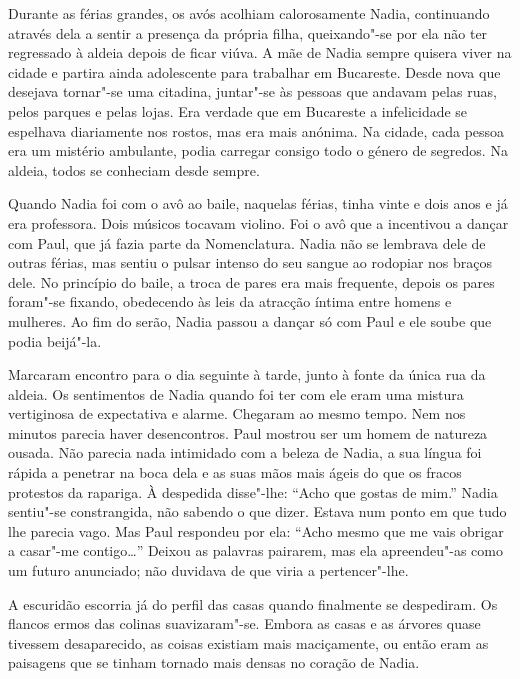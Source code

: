 Durante as férias grandes, os avós acolhiam calorosamente Nadia,
continuando através dela a sentir a presença da própria filha,
queixando"-se por ela não ter regressado à aldeia depois de ficar viúva.
A mãe de Nadia sempre quisera viver na cidade e partira ainda
adolescente para trabalhar em Bucareste. Desde nova que desejava
tornar"-se uma citadina, juntar"-se às pessoas que andavam pelas ruas,
pelos parques e pelas lojas. Era verdade que em Bucareste a infelicidade
se espelhava diariamente nos rostos, mas era mais anónima. Na cidade,
cada pessoa era um mistério ambulante, podia carregar consigo todo o
género de segredos. Na aldeia, todos se conheciam desde sempre.

Quando Nadia foi com o avô ao baile, naquelas férias, tinha vinte e dois
anos e já era professora. Dois músicos tocavam violino. Foi o avô que a
incentivou a dançar com Paul, que já fazia parte da Nomenclatura. Nadia
não se
lembrava dele de outras férias, mas sentiu o pulsar intenso do seu
sangue ao rodopiar nos braços dele. No princípio do baile, a troca de
pares era mais frequente, depois os pares foram"-se fixando, obedecendo
às leis da atracção íntima entre homens e mulheres. Ao fim do serão,
Nadia passou a dançar só com Paul e ele soube que podia beijá"-la.

Marcaram encontro para o dia seguinte à tarde, junto à fonte da única
rua da aldeia. Os sentimentos de Nadia quando foi ter com ele eram uma
mistura vertiginosa de expectativa e alarme. Chegaram ao mesmo tempo.
Nem nos minutos parecia haver desencontros. Paul mostrou ser um homem de
natureza ousada. Não parecia nada intimidado com a beleza de Nadia, a
sua língua foi rápida a penetrar na boca dela e as suas mãos mais ágeis
do que os fracos protestos da rapariga. À despedida disse"-lhe: ``Acho que
gostas de mim.'' Nadia sentiu"-se constrangida, não sabendo o que dizer.
Estava num ponto em que tudo lhe parecia vago. Mas Paul respondeu por
ela: ``Acho mesmo que me vais obrigar a casar"-me contigo\ldots{}'' Deixou
as palavras pairarem, mas ela apreendeu"-as como um futuro anunciado; não
duvidava de que viria a pertencer"-lhe.

A escuridão escorria já do perfil das casas quando finalmente se despediram. Os flancos ermos das colinas suavizaram"-se. Embora
as casas e as árvores quase tivessem desaparecido, as coisas existiam
mais maciçamente, ou então eram as paisagens que se tinham tornado mais
densas no coração de Nadia.

